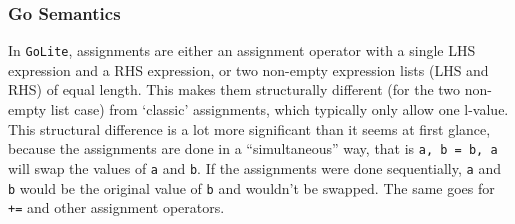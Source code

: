 \documentclass[11pt]{article}
\begin{document}
\subsubsection{Go Semantics}
\label{sec:orgfc5243a}
In \texttt{GoLite}, assignments are either an assignment operator with a
single LHS expression and a RHS expression, or two non-empty
expression lists (LHS and RHS) of equal length. This makes them structurally
different (for the two non-empty list case) from `classic'
assignments, which typically only allow one l-value.
This structural difference is a lot more significant than it seems
at first glance, because the assignments are done in a ``simultaneous''
way, that is \texttt{a, b = b, a} will swap the values of \texttt{a} and \texttt{b}. If the
assignments were done sequentially, \texttt{a} and \texttt{b} would be the
original value of \texttt{b} and wouldn't be swapped. The same goes for \texttt{+=} and
other assignment operators.
\end{document}
